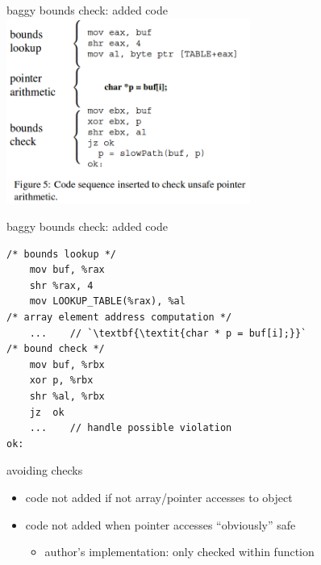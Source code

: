 \usetikzlibrary{calc}
\begin{frame}{baggy bounds check: added code}
    \includegraphics[width=0.6\textwidth]{../bounds/bb-bounds-check}
\end{frame}

\begin{frame}[fragile,label=addedCode]{baggy bounds check: added code}
    \lstset{language=myasm,style=small}
    \begin{lstlisting}
/* bounds lookup */
    mov buf, %rax
    shr %rax, 4
    mov LOOKUP_TABLE(%rax), %al
/* array element address computation */
    ...    // `\textbf{\textit{char * p = buf[i];}}`
/* bound check */
    mov buf, %rbx
    xor p, %rbx
    shr %al, %rbx
    jz  ok
    ...    // handle possible violation
ok:
\end{lstlisting}

\end{frame}

\begin{frame}{avoiding checks}
    \begin{itemize}
        \item code not added if not array/pointer accesses to object
        \item code not added when pointer accesses ``obviously'' safe
            \begin{itemize}
            \item author's implementation: only checked within function
            \end{itemize}
    \end{itemize}
\end{frame}

